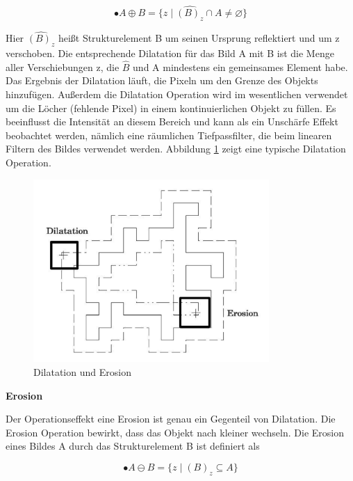 \begin{equation}
•A \oplus B =\lbrace z \mid \widehat{(B)_z} \cap A \ne \varnothing \rbrace  
\end{equation}

Hier $ \widehat{(B)_z} $ heißt Strukturelement B um seinen Ursprung reflektiert und um z verschoben. Die entsprechende Dilatation für das Bild A mit B ist die Menge aller Verschiebungen z, die $ \widehat{B} $ und A mindestens ein gemeinsames Element habe. Das Ergebnis der Dilatation läuft, die Pixeln um den Grenze des Objekts hinzufügen. Außerdem die Dilatation Operation wird im wesentlichen verwendet um die Löcher (fehlende Pixel) in einem kontinuierlichen Objekt zu füllen. Es beeinflusst die Intensität an diesem Bereich und kann als ein Unschärfe Effekt beobachtet werden, nämlich eine räumlichen Tiefpassfilter, die beim linearen Filtern des Bildes verwendet werden. Abbildung \ref{fig:Dilatation und Erosion} zeigt eine typische Dilatation Operation.

\begin{figure}[htb]
 \centering 
  \includegraphics[keepaspectratio,width=0.8\textwidth]{images/4_ZweiteErfahrung/Morphological/DilatationundErosion.pdf}
 \caption{Dilatation und Erosion}
 \label{fig:Dilatation und Erosion}
\end{figure} 


\textbf{Erosion}

Der Operationseffekt eine Erosion ist genau ein Gegenteil von Dilatation. Die Erosion Operation bewirkt, dass das Objekt nach kleiner wechseln. Die Erosion eines Bildes A durch das Strukturelement B ist definiert als 

\begin{equation}
•A \ominus B =\lbrace z \mid (B)_z \subseteq A \rbrace  
\end{equation}

